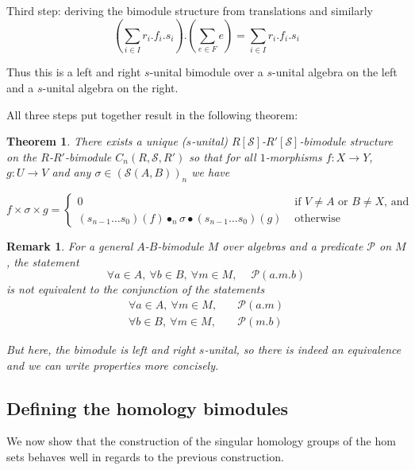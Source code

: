 \documentclass[a4paper,fleqn]{cas-sc}
\newtheorem{thm}{Theorem}%
\newtheorem{rem}{Remark}%
\newcommand{\cS}{{\mathcal{S}}}
\begin{document}
\begin{paragraph}{Third step: deriving the bimodule structure from translations}
and similarly
\[\left(\sum_{i \in I} r_i. f_i.s_i\right).\left(\sum_{e \in F} e\right) 
=\sum_{i \in I} r_i. f_i.s_i\]

Thus this is a left and right $s$-unital bimodule over a $s$-unital algebra on the left and a $s$-unital algebra on the right.



\end{paragraph}



All three steps put together result in the following theorem:

\begin{thm}
\label{thm:13}
There exists a  unique ($s$-unital) $R[\cS]$-$R'[\cS]$-bimodule structure on the $R$-$R'$-bimodule $C_n \left( R, \cS, R'\right)$ so that for all $1$-morphisms $f : X \rightarrow Y$, $g : U \rightarrow V$ and any $\sigma \in (\cS(A,B))_n$ we have

\[
f \times \sigma \times g = 
\begin{cases}
    
 0 & \text{ if } V \neq A \text{ or } B \neq X 
\text{, and } \\
(s_{n-1}\dots s_0)(f) \bullet_n 
\sigma
\bullet (s_{n-1}\dots s_0)(g) & \text{ otherwise}
\end{cases}
\]
\end{thm}

\begin{rem}
For a general $A$-$B$-bimodule $M$ over algebras and a predicate $\mathcal{P}$ on $M$, the statement
\[ 
\forall a \in A, \ \forall b \in B, \ \forall m \in M, \ \quad
\mathcal{P} (a.m.b)
\]
is not equivalent to the conjunction of the statements
\begin{align*}
    \forall a \in A, \ \forall m \in M, \quad
& \mathcal{P} (a.m)\\
 \forall b \in B, \ \forall m \in M, \quad
&\mathcal{P} (m.b)
\end{align*}

But here, the bimodule is left and right $s$-unital, so there is indeed an equivalence and we can write properties more concisely.
\end{rem}

\subsection{Defining the homology bimodules}
We now show that the construction of the singular homology groups of the hom sets behaves well in regards to the previous construction.
\end{document}
